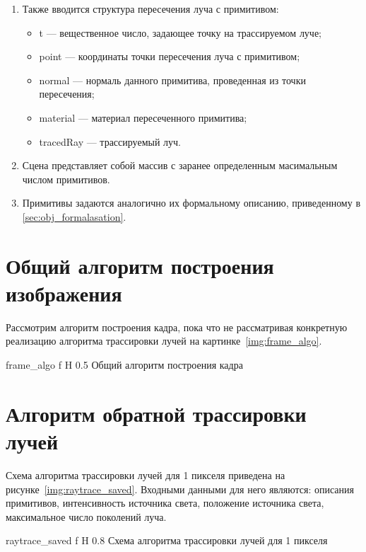 \begin{enumerate}
	
	
	\item  Также вводится структура пересечения луча с примитивом:
	\begin{itemize}
		\item t --- вещественное число, задающее точку на трассируемом луче;
		\item point --- координаты точки пересечения луча с примитивом;
		\item normal --- нормаль данного примитива, проведенная из точки пересечения;
		\item material --- материал пересеченного примитива;
		\item tracedRay --- трассируемый луч.
	\end{itemize}
	
	\item Сцена представляет собой массив с заранее определенным масимальным числом примитивов.
	\item Примитивы задаются аналогично их формальному описанию, приведенному в \ref{sec:obj_formalasation}.
\end{enumerate}

\section{Общий алгоритм построения изображения}
Рассмотрим алгоритм построения кадра, пока что не рассматривая конкретную реализацию алгоритма трассировки лучей на картинке~\ref{img:frame_algo}.




{frame_algo} %
{f} %
{H} %
{0.5\textwidth} %
{Общий алгоритм построения кадра} %







\section{Алгоритм обратной трассировки лучей}
Схема алгоритма трассировки лучей для 1 пикселя приведена на рисунке~\ref{img:raytrace_saved}. Входными данными для него являются: описания примитивов,
интенсивность источника света, положение источника света, максимальное число поколений луча.


{raytrace_saved} %
{f} %
{H} %
{0.8\textwidth} %
{Схема алгоритма трассировки лучей для 1 пикселя} %

